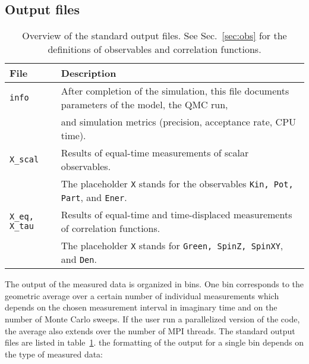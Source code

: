 \subsection{Output files} \label{sec:output}
%
\begin{table}[h]
   \begin{tabular}{l l}
   File & Description \\\hline
   \texttt{info} & After completion of the simulation, this file documents parameters of the  model, the QMC run, \\
   & and simulation metrics (precision, acceptance rate, CPU time).\\
   \texttt{X\_scal} & Results of equal-time measurements of scalar observables. \\
   & The placeholder \texttt{X} stands for the observables \texttt{Kin, Pot, Part}, and \texttt{Ener}. \\
   \texttt{X\_eq, X\_tau} & Results of equal-time and time-displaced measurements of correlation functions. \\
   & The placeholder \texttt{X} stands for \texttt{Green, SpinZ, SpinXY}, and \texttt{Den}. \\   
   \end{tabular}
   \caption{Overview of the standard output files. 
  See Sec.~\ref{sec:obs} for the definitions of observables and correlation functions. \label{table:output}}
\end{table}
%
The output of the measured data is organized in bins. One bin corresponds to the geometric average over a certain number of individual measurements which depends 
on the chosen measurement interval in imaginary time and on the number of Monte Carlo sweeps. If the user run a parallelized version of the code, the average also extends 
over the number of MPI threads. 
The standard output files are listed in table~\ref{table:output}. 
the formatting of the output for a single bin depends on the type of measured data: 
